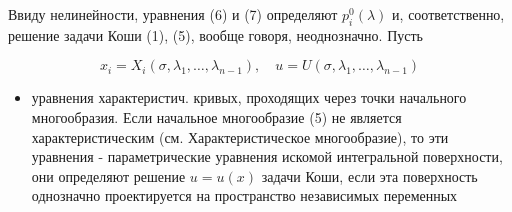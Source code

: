 \documentclass[10pt]{article}
\begin{document}
Ввиду нелинейности, уравнения (6) и (7) определяют $p_{i}^{0}(\lambda)$ и, соответственно, решение задачи Коши (1), (5), вообще говоря, неоднозначно. Пусть



\[

x_{i}=X_{i}\left(\sigma, \lambda_{1}, \ldots, \lambda_{n-1}\right), \quad u=U\left(\sigma, \lambda_{1}, \ldots, \lambda_{n-1}\right)

\]



\begin{itemize}

  \item уравнения характеристич. кривых, проходящих через точки начального многообразия. Если начальное многообразие (5) не является характеристическим (см. Характеристическое многообразие), то эти уравнения - параметрические уравнения искомой интегральной поверхности, они определяют решение $u=u(x)$ задачи Коши, если эта поверхность однозначно проектируется на пространство независимых переменных

\end{itemize}
\end{document}
